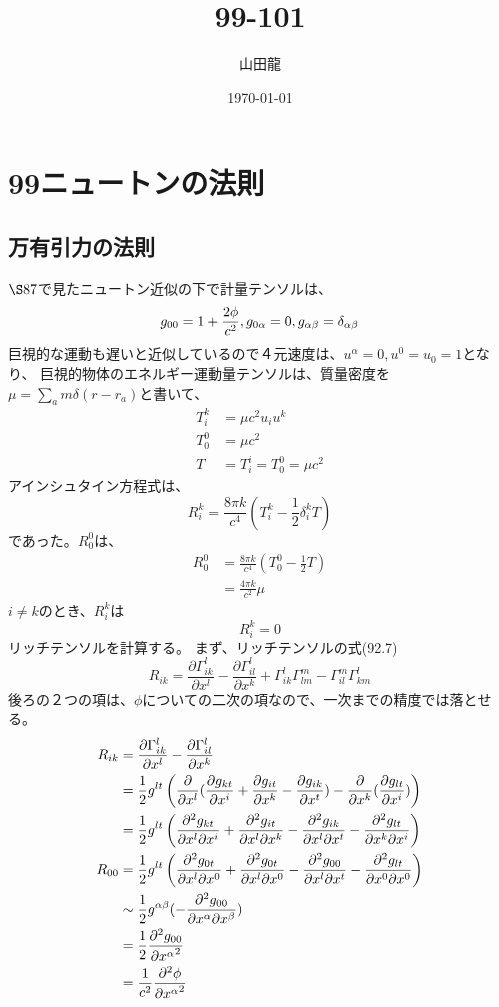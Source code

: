 \documentclass{jsarticle}
\date{\today}
\author{山田龍}
\title{99-101}
\newcommand{\pder}[2][]{\frac{\partial#1}{\partial#2}}
\newcommand{\ppder}[2][]{\frac{\partial^2#1}{{\partial#2}^2}}
\newcommand{\pikdergx}[3][]{\frac{\partial^2 g_{#1}}{{\partial x^{#2} \partial x^{#3}}}}
\newcommand{\pderx}[2][]{\pder[#1]{x^{#2}}}
\newcommand{\pdergx}[2][]{\pderx[g_{#1}]{#2}}
\newcommand{\half}{\frac{1}{2}}
\newcommand{\beq}{\begin{equation}}
\newcommand{\eeq}{\end{equation}}
\newcommand{\GaT}[3]{\Gamma^{#1}_{#2 #3}}
\begin{document}
\maketitle
\section{99ニュートンの法則}
\subsection{万有引力の法則}
$\S 87$で見たニュートン近似の下で計量テンソルは、
\beq
g_{00} = 1 + \frac{2\phi}{c^2},g_{0\al} = 0,g_{\al \be} = \delta_{\al \be}
\eeq
巨視的な運動も遅いと近似しているので４元速度は、$u^\alpha = 0, u^0 = u_0 = 1$となり、
巨視的物体のエネルギー運動量テンソルは、質量密度を$\mu = \sum_a m \delta(r-r_a)$と書いて、
\begin{align}
    T^k_{i} &= \mu c^2 u_i u^k\\
    T^0_0 &= \mu c^2\\
    T &= T^i_i = T^0_0 = \mu c^2
\end{align}
アインシュタイン方程式は、
\beq
    R^k_i = \frac{8\pi k}{c^4} (T^k_i - \half \delta^k_i T)
\eeq
であった。$R^0_0$は、
\begin{align}
    R^0_0 &= \frac{8\pi k}{c^4} (T^0_0 - \half T)\\
        &= \frac{4\pi k}{c^2} \mu
\end{align}
$i \neq k$のとき、$R^k_i$は
\beq
    R^k_i = 0
\eeq
リッチテンソルを計算する。
まず、リッチテンソルの式(92.7)
\beq
    R_{ik} =  \pder[\Gamma^l_{ik}]{x^l} - \pder[\Gamma^l_{il}]{x^k}
    + \GaT{l}{i}{k}\GaT{m}{l}{m} - \GaT{m}{i}{l}\GaT{l}{k}{m}
\eeq
後ろの２つの項は、$\phi$についての二次の項なので、一次までの精度では落とせる。
\begin{align}
    R_{ik} &= \pder[\Gamma^l_{ik}]{x^l} - \pder[\Gamma^l_{il}]{x^k}\\
            &= \half g^{lt} 
            \left( \pderx[]{l}(\pdergx[kt]{i} + \pdergx[it]{k} - \pdergx[ik]{t}) - \pderx[]{k}(\pdergx[lt]{i})\right)\\
            &= \half g^{lt} \left(
            \pikdergx[kt]{l}{i} + \pikdergx[it]{l}{k} - \pikdergx[ik]{l}{t} - \pikdergx[lt]{k}{i}
            \right)\\
    R_{00} &= \half g^{lt} \left(
            \pikdergx[0t]{l}{0} + \pikdergx[0t]{l}{0} - \pikdergx[00]{l}{t} - \pikdergx[lt]{0}{0}
            \right)\\
           &\sim \half g^{\al \be}(- \pikdergx[00]{\al}{\be} )\\
           &= \half \ppder[g_{00}]{x^\al}\\
           &= \frac{1}{c^2} \ppder[\phi]{x^\al}
\end{align}
\end{document}

